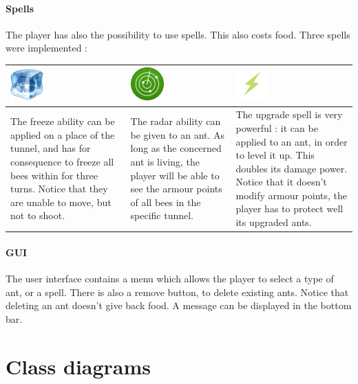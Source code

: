 \documentclass[a4paper]{article}
\begin{document}
\paragraph{Spells} The player has also the possibility to use spells. This also costs food. Three spells were implemented :
 
\begin{center}
	\begin{tabular}{|p{4cm}|p{4cm}|p{4cm}|}
		\hline
		\rule[1mm]{0pt}{8mm}
		  \includegraphics[scale=0.5]{freeze.png}
		& \includegraphics[scale=0.5]{radar.png}
		& \includegraphics[scale=0.5]{double.png} \\
		\hline
		\rule[1mm]{0pt}{5mm}
		   The freeze ability can be applied on a place of the tunnel, and has for consequence to freeze all bees within for three turns. Notice that they are unable to move, but not to shoot. 
		 & The radar ability can be given to an ant. As long as the concerned ant is living, the player will be able to see the armour points of all bees in the specific tunnel.
		 & The upgrade spell is very powerful : it can be applied to an ant, in order to level it up. This doubles its damage power. Notice that it doesn't modify armour points, the player has to protect well its upgraded ants. \\
		\hline
	\end{tabular}
\end{center}

\paragraph{GUI} The user interface contains a menu which allows the player to select a type of ant, or a spell. There is also a remove button, to delete existing ants. Notice that deleting an ant doesn't give back food. A message can be displayed in the bottom bar.


\section{Class diagrams}
\end{document}
